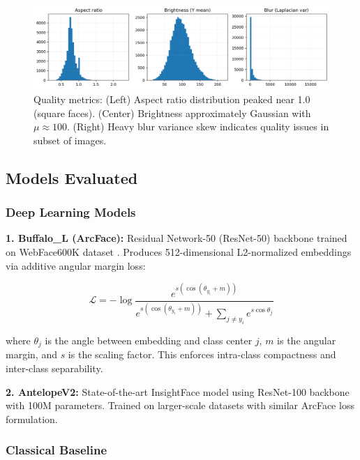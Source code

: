 \documentclass[11pt,a4paper]{article}
\begin{document}
\begin{figure}[H]
    \centering
    \includegraphics[width=\textwidth]{runs/eda/quality_hists.png}
    \caption{Quality metrics: (Left) Aspect ratio distribution peaked near 1.0 (square faces). (Center) Brightness approximately Gaussian with $\mu \approx 100$. (Right) Heavy blur variance skew indicates quality issues in subset of images.}
    \label{fig:quality}
\end{figure}

\subsection{Models Evaluated}

\subsubsection{Deep Learning Models}

\textbf{1. Buffalo\_L (ArcFace):} Residual Network-50 (ResNet-50) backbone trained on WebFace600K dataset \cite{deng2019arcface}. Produces 512-dimensional L2-normalized embeddings via additive angular margin loss:

\begin{equation}
    \mathcal{L} = -\log \frac{e^{s(\cos(\theta_{y_i} + m))}}{e^{s(\cos(\theta_{y_i} + m))} + \sum_{j \neq y_i} e^{s \cos \theta_j}}
\end{equation}

where $\theta_j$ is the angle between embedding and class center $j$, $m$ is the angular margin, and $s$ is the scaling factor. This enforces intra-class compactness and inter-class separability.

\textbf{2. AntelopeV2:} State-of-the-art InsightFace model using ResNet-100 backbone with 100M parameters. Trained on larger-scale datasets with similar ArcFace loss formulation.

\subsubsection{Classical Baseline}
\end{document}
